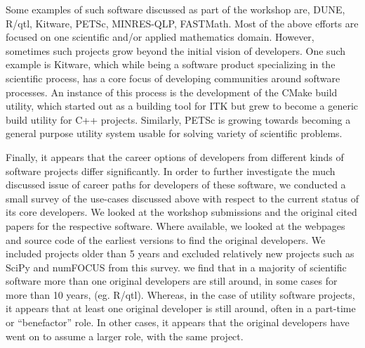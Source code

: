 \documentclass[11pt, oneside]{amsart}
\newcommand{\toolname}[1] {\textsf{#1}}
\begin{document}
Some examples of such software discussed as part of the workshop are,
\toolname{DUNE}, \toolname{R/qtl}, \toolname{Kitware}, \toolname{PETSc}, \toolname{MINRES-QLP},
\toolname{FASTMath}.  Most of the above efforts are focused on one scientific
and/or applied mathematics domain. However, sometimes such projects grow beyond
the initial vision of developers. One such example is \toolname{Kitware}, which
while being a software product specializing in the scientific process, has a
core focus of developing communities around software processes. An instance of
this process is the development of the \toolname{CMake} build utility, which
started out as a building tool for \toolname{ITK} but grew to become a generic
build utility for C++ projects. Similarly, \toolname{PETSc} is growing towards
becoming a general purpose utility system usable for solving variety of
scientific problems.

Finally, it appears that the career options of developers from different kinds
of software projects differ significantly. In order to further investigate the
much discussed issue of career paths for developers of these software, we
conducted a small survey of the use-cases discussed above with respect to the
current status of its core developers. We looked at the workshop submissions
and the original cited papers for the respective software. Where available, we
looked at the webpages and source code of the earliest versions to find the
original developers. We included projects older than 5 years and excluded
relatively new projects such as \toolname{SciPy} and \toolname{numFOCUS} from this
survey. we find that in a majority of scientific software more than one
original developers are still around, in some cases for more than 10 years,
(eg. \toolname{R/qtl}).  Whereas, in the case of utility software projects, it
appears that at least one original developer is still around, often in a
part-time or ``benefactor'' role. In other cases, it appears that the original
developers have went on to assume a larger role, with the same project.
\end{document}
